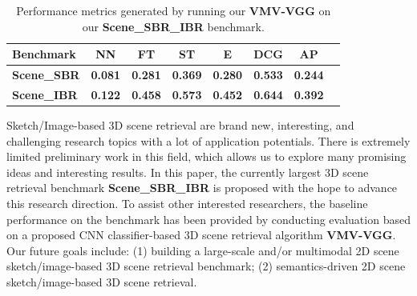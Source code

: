 \documentclass[times, 10pt,twocolumn]{article}
\begin{document}
\begin{table}[htb]
	\centering
	\caption{Performance metrics generated by running our \textbf{VMV-VGG} on our \textbf{Scene\_SBR\_IBR} benchmark.}
	\label{tab:SceneSBR}
	\begin{tabular}{lccccccc}
			\hline		
	\normalsize {\textbf{Benchmark}} &\normalsize {\textbf{NN}}  &\normalsize {\textbf{FT}} &\normalsize {\textbf{ST}} &\normalsize {\textbf{E}} &\normalsize {\textbf{DCG}} &\normalsize {\textbf{AP}}\\
\hline
\textbf{Scene\_SBR}  &\textbf{0.081}	 &\textbf{0.281}	 &\textbf{0.369}	 &\textbf{0.280}	 &\textbf{0.533}  &\textbf{0.244}\\
\hline
\textbf{Scene\_IBR}  &\textbf{0.122}	 &\textbf{0.458}	 &\textbf{0.573}	 &\textbf{0.452}	 &\textbf{0.644}  &\textbf{0.392}\\				
\hline		
\end{tabular}
\end{table}
Sketch/Image-based 3D scene retrieval are brand new, interesting, and challenging research topics with a lot of application potentials. There is extremely limited preliminary work in this field, which allows us to explore many promising ideas and interesting results. In this paper, the currently largest 3D scene retrieval benchmark \textbf{Scene\_SBR\_IBR} is proposed with the hope to advance this research direction. To assist other interested researchers, the baseline performance on the benchmark has been provided by conducting evaluation based on a proposed CNN classifier-based 3D scene retrieval algorithm \textbf{VMV-VGG}.  Our future goals include: (1) building a large-scale and/or multimodal 2D scene sketch/image-based 3D scene retrieval benchmark; (2) semantics-driven 2D scene sketch/image-based 3D scene retrieval.



\end{document}

